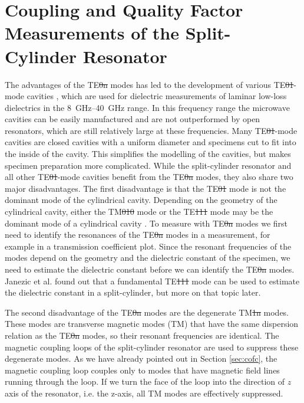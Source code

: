 \section{Coupling and Quality Factor Measurements of the Split-Cylinder Resonator}
The advantages of the TE\st{0n} modes has led to the development of various TE\st{01}-mode cavities \cite{NPL}, which are used for dielectric measurements of laminar low-loss dielectrics in the \SIrange{8}{40}{\giga\hertz} range. In this frequency range the microwave cavities can be easily manufactured and are not outperformed by open resonators, which are still relatively large at these frequencies. Many TE\st{01}-mode cavities are closed cavities with a uniform diameter and specimens cut to fit into the inside of the cavity. This simplifies the modelling of the cavities, but makes specimen preparation more complicated. While the split-cylinder resonator and all other TE\st{01}-mode cavities benefit from the TE\st{0n} modes, they also share two major disadvantages. The first disadvantage is that the TE\st{01} mode is not the dominant mode of the cylindrical cavity. Depending on the geometry of the cylindrical cavity, either the TM\st{010} mode or the TE\st{111} mode may be the dominant mode of a cylindrical cavity \cite[Sec. 9.3.2]{balanis}. To measure with TE\st{0n} modes we first need to identify the resonances of the TE\st{0n} modes in a measurement, for example in a transmission coefficient plot. Since the resonant frequencies of the modes depend on the geometry and the dielectric constant of the specimen, we need to estimate the dielectric constant before we can identify the TE\st{0n} modes. Janezic et al. \cite{janezicarz} found out that a fundamental TE\st{111} mode can be used to estimate the dielectric constant in a split-cylinder, but more on that topic later.

The second disadvantage of the TE\st{0n} modes are the degenerate TM\st{1n} modes. These modes are transverse magnetic modes (TM) that have the same dispersion relation as the TE\st{0n} modes, so their resonant frequencies are identical. The magnetic coupling loops of the split-cylinder resonator are used to suppress these degenerate modes. As we have already pointed out in Section \ref{sec:cofc}, the magnetic coupling loop couples only to modes that have magnetic field lines running through the loop. If we turn the face of the loop into the direction of $z$ axis of the resonator, i.e. the z-axis, all TM modes are effectively suppressed.

